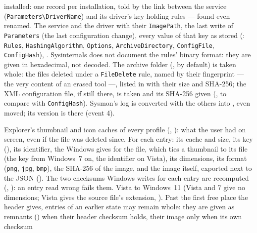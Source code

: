 \documentclass[11pt,a4paper,oneside]{report}
\begin{document}
\begin{description}[style=nextline,leftmargin=1.2em]
        installed: one record per installation, told by the link between the
        service (\texttt{Parameters\textbackslash DriverName}) and its
        driver's key holding rules — found even renamed. The service and the
        driver with their \texttt{ImagePath}, the last write of
        \texttt{Parameters} (the last configuration change), every value of
        that key as stored (: \texttt{Rules},
        \texttt{HashingAlgorithm}, \texttt{Options},
        \texttt{ArchiveDirectory}, \texttt{ConfigFile}, \texttt{ConfigHash}),
        . Sysinternals does not document the rules' binary
        format: they are given in hexadecimal, not decoded. The archive folder
        (,  by default)
        is taken whole: the files deleted under a \texttt{FileDelete} rule,
        named by their fingerprint — the very content of an erased tool —,
        listed in  with their size and SHA-256; the XML
        configuration file, if still there, is taken and its SHA-256 given
        (, to compare with \texttt{ConfigHash}).
        Sysmon's log is converted with the others into ,
        even moved; its version is there (event 4).
  \item[\fichier{thumbcache.json}] Explorer's thumbnail and icon caches of
        every profile (, ):
        what the user had on screen, even if the file was deleted since. For
        each entry: its cache and size, its key (), its identifier,
        the  Windows gives for the file, which ties a
        thumbnail to its file (the key from Windows~7 on, the identifier on
        Vista), its dimensions, its format (\texttt{png}, \texttt{jpg},
        \texttt{bmp}), the SHA-256 of the image, and the image itself, exported
        next to the JSON
        ().
        The two checksums Windows writes for each entry are recomputed
        (, ): an entry read
        wrong fails them. Vista to Windows~11 (Vista and 7 give no dimensions;
        Vista gives the source file's extension, ).
        Past the first free place the header gives, entries of an earlier state
        may remain whole: they are given as remnants () when
        their header checksum holds, their image only when its own checksum

\end{description}
\end{document}
